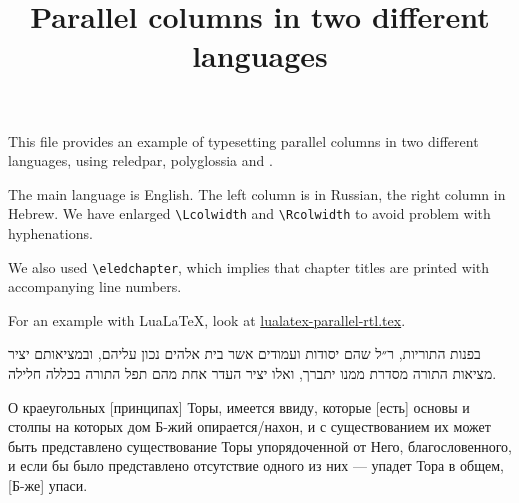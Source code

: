 \documentclass{book}
\newcommand{\LuaLaTeX}{Lua\LaTeX}
\begin{document}
\date{}
\title{Parallel columns in two different languages}



{\let\newpage\relax\maketitle}
{\small
This file provides an example of typesetting parallel columns in two different languages, using reledpar, polyglossia and \XeLaTeX.

The main language is English. The left column is in Russian, the right column in Hebrew.
We have enlarged \verb+\Lcolwidth+ and  \verb+\Rcolwidth+ to avoid problem with hyphenations.

We also used \verb+\eledchapter+, which implies that chapter titles are printed with accompanying line numbers. 

For an example with \LuaLaTeX, look at \href{./lualatex-parallel-rtl.tex}{lualatex-parallel-rtl.tex}.
}



\begin{pairs}

\begin{Rightside} 
\begin{RTL}
\begin{hebrew}
\beginnumbering
\pstart
{}
\pend
\pstart
בפנות התוריות, ר״ל שהם יסודות ועמודים אשר בית אלהים נכון עליהם, ובמציאותם יציר מציאות התורה מסדרת ממנו יתברך, ואלו יציר העדר אחת מהם תפל התורה בכללה חלילה.
\pend    
\endnumbering
\end{hebrew}
\end{RTL}
\end{Rightside}




\begin{Leftside} 
\begin{russian}
\beginnumbering
\pstart
{}   
\pend 
\pstart
О краеугольных [принципах] Торы, имеется ввиду, которые [есть] основы и столпы на которых дом Б-жий опирается/нахон, и с существованием их может быть представлено существование Торы упорядоченной от Него, благословенного, и если бы было представлено отсутствие одного из них — упадет Тора в общем, [Б-же] упаси.
\pend
\endnumbering
\end{russian}
\end{Leftside}

\end{pairs}
\Columns
\end{document}
